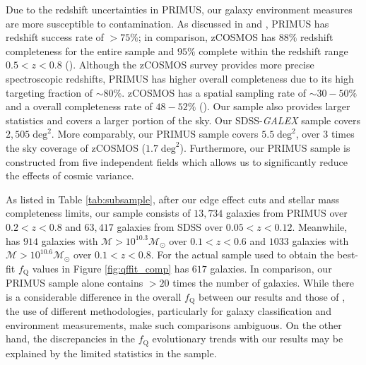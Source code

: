
Due to the redshift uncertainties in PRIMUS, our galaxy environment measures are more susceptible to contamination. As discussed in \cite{Coil:2011aa} and \cite{Cool:2013aa}, PRIMUS has redshift success rate of $> 75 \%$; in comparison, zCOSMOS has $88 \%$ redshift completeness for the entire sample and $95 \%$ complete within the redshift range $0.5 < z < 0.8$ (\citealt{Lilly:2009aa}). Although the zCOSMOS survey provides more precise spectroscopic redshifts, PRIMUS has higher overall completeness due to its high targeting fraction of $\sim 80 \%$. zCOSMOS has a spatial sampling rate of $\sim 30-50\%$ and a overall completeness rate of $48 - 52 \%$ (\citealt{Knobel:2012aa}). Our sample also provides larger statistics and covers a larger portion of the sky. Our SDSS-{\em GALEX} sample covers $2,505 \;\mathrm{deg}^2$. More comparably, our PRIMUS sample covers $5.5 \;\mathrm{deg}^2$, over 3 times the sky coverage of zCOSMOS ($1.7 \;\mathrm{deg}^2$). Furthermore, our PRIMUS sample is constructed from five independent fields which allows us to significantly reduce the effects of cosmic variance.

As listed in Table \ref{tab:subsample}, after our edge effect cuts and
stellar mass completeness limits, our sample consists of $13,734$
galaxies from PRIMUS over $0.2< z< 0.8$ and $63,417$ galaxies from
SDSS over $0.05 < z < 0.12$. Meanwhile, \cite{Iovino:2010aa} has $914$
galaxies with $\mathcal{M} > 10^{10.3} \mathcal{M}_{\odot}$ over $0.1
< z < 0.6$ and $1033$ galaxies with $\mathcal{M} > 10^{10.6}
\mathcal{M}_{\odot}$ over $0.1 < z < 0.8$. For the actual sample used
to obtain the best-fit $f_{\mathrm{Q}}$ values in Figure
\ref{fig:qffit_comp} \cite{Iovino:2010aa} has $617$ galaxies. In
comparison, our PRIMUS sample alone contains $> 20$ times the number
of galaxies. While there is a considerable difference in the overall
$f_{\mathrm{Q}}$ between our results and those of \cite{Iovino:2010aa},
the use of different methodologies, particularly for galaxy
classification and environment measurements, make such comparisons
ambiguous. On the other hand, the discrepancies in the $f_{\mathrm{Q}}$
evolutionary trends with our results may be explained by the limited
statistics in the \cite{Iovino:2010aa} sample.

